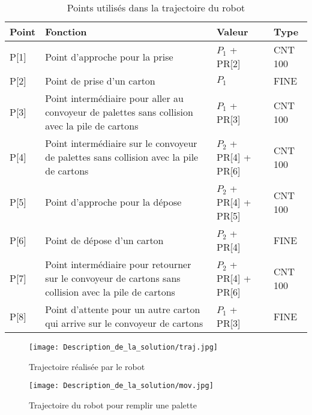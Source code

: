 \begin{table}[H]
	
	\caption{Points utilisés dans la trajectoire du robot}
	\label{tab:points}
	\begin{tabularx}{\textwidth}{>{\centering\arraybackslash}X|>{\centering\arraybackslash}X|>{\centering\arraybackslash}X|>{\centering\arraybackslash}X}			
		
		\textbf{Point}&	\textbf{Fonction}&	\textbf{Valeur}&	\textbf{Type}\\
		\hline		
		P[1]&	Point d’approche pour la prise&	$P_1$ + PR[2]&	CNT 100\\
		\hline		
		P[2]&	Point de prise d’un carton&		$P_1$&
		FINE\\
		\hline		
		P[3]&
		Point intermédiaire pour aller au convoyeur de palettes sans collision avec la pile de cartons &
		$P_1$ + PR[3]&
		CNT 100\\
		\hline		
		P[4]&
		Point intermédiaire sur le convoyeur de palettes sans collision avec la pile de cartons& 
		$P_2$ + PR[4] + PR[6]&
		CNT 100\\
		\hline		
		P[5]&
		Point d’approche pour la dépose&
		$P_2$ + PR[4] + PR[5]&
		CNT 100\\
		\hline
		P[6]&
		Point de dépose d’un carton&
		$P_2$ + PR[4]&
		FINE\\
		\hline
		P[7]&
		Point intermédiaire pour retourner sur le convoyeur de cartons sans collision avec la pile de cartons&
		$P_2$ + PR[4] + PR[6]&
		CNT 100\\
		\hline
		P[8]&
		Point d’attente pour un autre carton qui arrive sur le convoyeur de cartons&
		$P_1$ + PR[3]&
		FINE\\
	\end{tabularx}
\end{table}



\begin{figure}[H]
	\begin{center}	
		\texttt{[image: Description\_de\_la\_solution/traj.jpg]}
		\caption{Trajectoire réalisée par le robot}
		\label{fig:traj}
	\end{center}
\end{figure}

\begin{figure}[H]
	\begin{center}	
		\texttt{[image: Description\_de\_la\_solution/mov.jpg]}
		\caption{Trajectoire du robot pour remplir une palette}
		\label{fig:mov}
	\end{center}
\end{figure}











